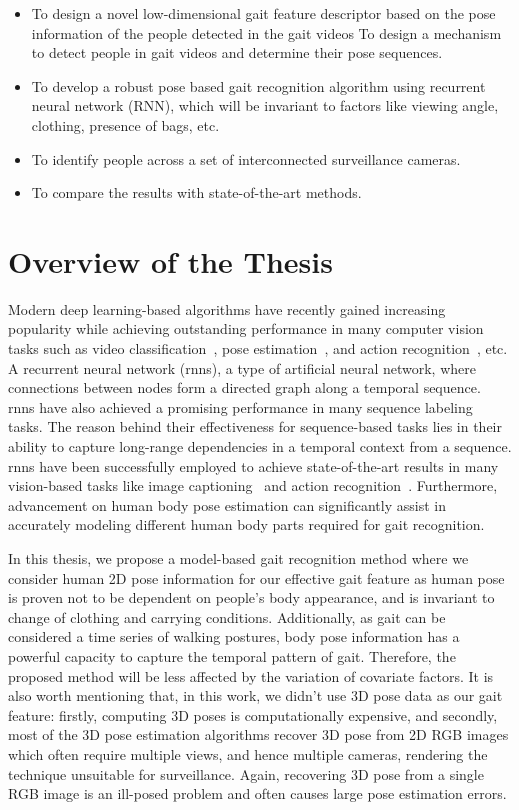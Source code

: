 \begin{itemize}
\item To design a novel low-dimensional gait feature descriptor based on the pose information of the people detected in the gait videos To design a mechanism to detect people in gait videos and determine their pose sequences. 

\item To develop a robust pose based gait recognition algorithm using recurrent neural network (RNN), which will be invariant to factors like viewing angle, clothing, presence of bags, etc.

\item To identify people across a set of interconnected surveillance cameras.

\item To compare the results with state-of-the-art methods.
\end{itemize}



\section{Overview of the Thesis}
Modern deep learning-based algorithms have recently gained increasing popularity while achieving outstanding performance in many computer vision tasks such as video classification~\cite{karpathy_14}, pose estimation~\cite{Cao_19}, and action recognition~\cite{Song_17, Du_15}, etc. A recurrent neural network (\gls{rnn}s), a type of artificial neural network, where connections between nodes form a directed graph along a temporal sequence. \gls{rnn}s have also achieved a promising performance in many sequence labeling tasks. The reason behind their effectiveness for sequence-based tasks lies in their ability to capture long-range dependencies in a temporal context from a sequence. \gls{rnn}s have been successfully employed to achieve state-of-the-art results in many vision-based tasks like image captioning~\cite{Mao_15} and action recognition~\cite{Song_17, Du_15}. Furthermore, advancement on human body pose estimation can significantly assist in accurately modeling different human body parts required for gait recognition. 

In this thesis, we propose a model-based gait recognition method where we consider human 2D pose information for our effective gait feature as human pose is proven not to be dependent on people's body appearance, and is invariant to change of clothing and carrying conditions. Additionally, as gait can be considered a time series of walking postures, body pose information has a powerful capacity to capture the temporal pattern of gait. Therefore, the proposed method will be less affected by the variation of covariate factors. It is also worth mentioning that, in this work, we didn't use 3D pose data as our gait feature: firstly, computing 3D poses is computationally expensive, and secondly, most of the 3D pose estimation algorithms recover 3D pose from 2D RGB images which often require multiple views, and hence multiple cameras, rendering the technique unsuitable for surveillance. Again, recovering 3D pose from a single RGB image is an ill-posed problem and often causes large pose estimation errors. 

